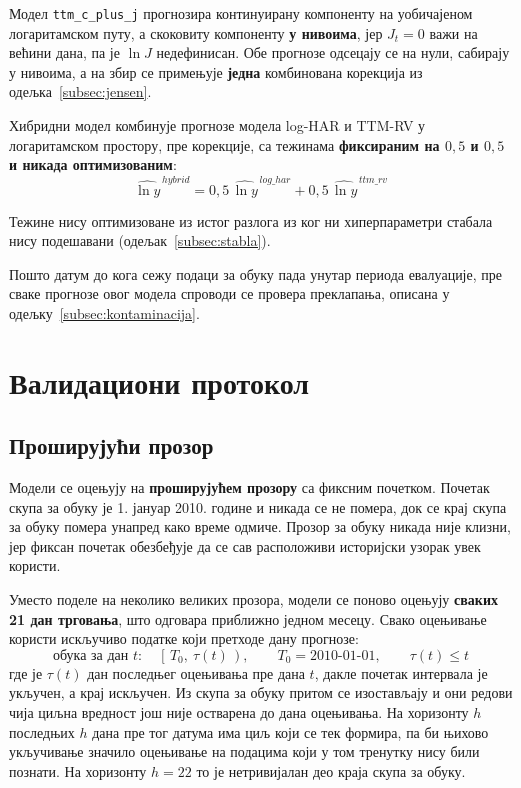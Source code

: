 Модел \texttt{ttm\_c\_plus\_j} прогнозира континуирану компоненту на уобичајеном
логаритамском путу, а скоковиту компоненту \textbf{у нивоима}, јер $J_t = 0$ важи на
већини дана, па је $\ln J$ недефинисан. Обе прогнозе одсецају се на нули, сабирају у
нивоима, а на збир се примењује \textbf{једна} комбинована корекција из
одељка~\ref{subsec:jensen}.

Хибридни модел комбинује прогнозе модела log-HAR и TTM-RV у логаритамском простору,
пре корекције, са тежинама \textbf{фиксираним на $0{,}5$ и $0{,}5$ и никада
оптимизованим}:
\nopagebreak
\begin{equation}
\widehat{\ln y}^{\,hybrid} = 0{,}5\,\widehat{\ln y}^{\,log\_har} + 0{,}5\,\widehat{\ln y}^{\,ttm\_rv}
\end{equation}

Тежине нису оптимизоване из истог разлога из ког ни хиперпараметри стабала нису
подешавани (одељак~\ref{subsec:stabla}).

Пошто датум до кога сежу подаци за обуку пада унутар периода евалуације,
пре сваке прогнозе овог модела спроводи се провера преклапања, описана у
одељку~\ref{subsec:kontaminacija}.

\section{Валидациони протокол}

\subsection{Проширујући прозор}
\label{subsec:validacija}

Модели се оцењују на \textbf{проширујућем прозору} са фиксним почетком. Почетак скупа за
обуку је 1. јануар 2010. године и никада се не помера, док се крај скупа за обуку
помера унапред како време одмиче. Прозор за обуку никада није клизни, јер фиксан
почетак обезбеђује да се сав расположиви историјски узорак увек користи.

Уместо поделе на неколико великих прозора, модели се поново оцењују
\textbf{сваких 21 дан трговања}, што одговара приближно једном месецу. Свако
оцењивање користи искључиво податке који претходе дану прогнозе:
\begin{equation}
\text{обука за дан } t:\quad
\left[\,T_0,\ \tau(t)\,\right),
\qquad
T_0 = \text{2010-01-01},
\qquad
\tau(t) \le t
\end{equation}
где је $\tau(t)$ дан последњег оцењивања пре дана $t$, дакле почетак интервала је
укључен, а крај искључен. Из скупа за обуку притом се изостављају и они редови чија
циљна вредност још није остварена до дана оцењивања. На хоризонту $h$ последњих $h$
дана пре тог датума има циљ који се тек формира, па би њихово укључивање значило
оцењивање на подацима који у том тренутку нису били познати. На хоризонту $h = 22$ то
је нетривијалан део краја скупа за обуку.

